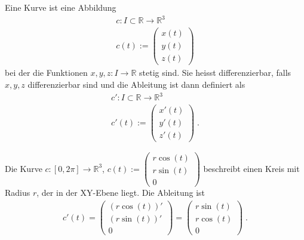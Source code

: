 \begin{Definition}
Eine Kurve ist eine  Abbildung 
\begin{align*}
c: I \subset \mathbb{R} \to \mathbb{R}^3 \\
c(t) := \begin{pmatrix} x(t) \\  y(t) \\ z(t) \end{pmatrix}
\end{align*}
bei der die Funktionen $x, y, z : I \to \mathbb{R}$ stetig sind. Sie heisst differenzierbar, falls $x,y,z$ differenzierbar sind und die Ableitung ist dann definiert als 
\begin{align*}
c': I \subset \mathbb{R} \to \mathbb{R}^3 \\
c'(t) := \begin{pmatrix} x'(t) \\  y'(t) \\ z'(t) \end{pmatrix} \; .
\end{align*}
 \end{Definition}

\begin{Beispiel}
Die Kurve 
$c : [0, 2\pi]  \to  \mathbb{R}^3$, $c(t) :=  \begin{pmatrix} r \cos(t) \\ r  \sin(t) \\  0 \end{pmatrix}$
beschreibt einen Kreis mit Radius $r$, der in der XY-Ebene liegt. Die Ableitung ist
\begin{align*}
c'(t) =  \begin{pmatrix} (r \cos(t))' \\  (r\sin(t))' \\  0 \end{pmatrix} = \begin{pmatrix} r \sin(t) \\ r \cos(t) \\  0 \end{pmatrix} \;.
\end{align*} 
\end{Beispiel}

